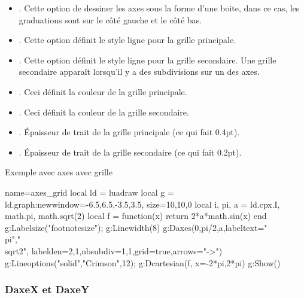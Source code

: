 \begin{itemize}
\begin{itemize}
            \item {}. Cette option de dessiner les axes sous la forme d'une boite, dans ce cas, les graduations sont sur le côté gauche et le côté bas.
            \item {}. Cette option définit le style ligne pour la grille principale.
            \item {}. Cette option définit le style ligne pour la grille secondaire. Une grille secondaire apparaît lorsqu'il y a des subdivisions sur un des axes.
            \item  {}. Ceci définit la couleur de la grille principale.
            \item {}. Ceci définit la couleur de la grille secondaire.
            \item {}. Épaisseur de trait de la grille principale (ce qui fait 0.4pt).
            \item {}. Épaisseur de trait de la grille secondaire (ce qui fait 0.2pt).
        \end{itemize}
\end{itemize}

\begin{demo}{Exemple avec axes avec grille}
\begin{luadraw}{name=axes_grid}
local ld = luadraw
local g = ld.graph:new{window={-6.5,6.5,-3.5,3.5}, size={10,10,0}}
local i, pi, a = ld.cpx.I, math.pi, math.sqrt(2)
local f = function(x) return 2*a*math.sin(x) end
g:Labelsize("footnotesize"); g:Linewidth(8)
g:Daxes({0,pi/2,a},{labeltext={"\\pi","\\sqrt{2}"}, labelden={2,1},nbsubdiv={1,1},grid=true,arrows="->"})
g:Lineoptions("solid","Crimson",12); g:Dcartesian(f, {x={-2*pi,2*pi}})
g:Show()
\end{luadraw}
\end{demo}

\subsubsection{DaxeX et DaxeY}

